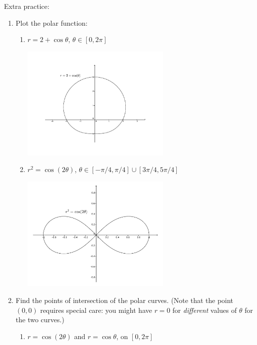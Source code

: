 \documentclass[12pt]{article}
\begin{document}
Extra practice:
\begin{enumerate}
\item Plot the polar function:
\begin{enumerate}
\item $r=2+\cos\theta$, $\theta\in [0,2\pi]$

\begin{center}
 \includegraphics[width=0.6\textwidth]{WS6-1a}
\end{center}

\item $r^2=\cos(2\theta)$, $\theta\in [-\pi/4,\pi/4]\cup [3\pi/4,5\pi/4]$

\begin{center}
 \includegraphics[width=0.6\textwidth]{WS6-1d}
\end{center}
\end{enumerate}

\newpage

\item Find the points of intersection of the polar curves. (Note that the point $(0,0)$ requires special care: you might have $r=0$ for \textit{different} values of $\theta$ for the two curves.)
\begin{enumerate}
\item $r=\cos(2\theta)$ and $r=\cos\theta$, on $[0,2\pi]$


\end{enumerate}
\end{enumerate}
\end{document}
